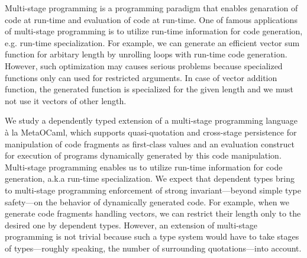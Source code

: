 \documentclass[master,english]{kuisthesis}
\begin{document}
\date{Feburary 15, 2020}			%

\maketitle

\begin{eabstract}


Multi-stage programming is a programming paradigm that enables genaration of
code at run-time and evaluation of code at run-time. One of famous
applications of multi-stage programming is to utilize run-time information
for code generation, e.g. run-time specialization. For example, we can
generate an efficient vector sum function for arbitary length by unrolling
loops with run-time code generation. However, such optimization may causes
serious problems because specialized functions only can used for restricted
arguments. In case of vector addition function, the generated function is
specialized for the given length and we must not use it vectors of other
length.


We study a dependently typed extension of a multi-stage programming language
\`a la MetaOCaml, which supports quasi-quotation and cross-stage persistence
for manipulation of code fragments as first-class values and an evaluation
    construct for execution of programs dynamically generated by this code
    manipulation. Multi-stage programming enables us to utilize run-time
    information for code generation, a.k.a run-time specialization. We expect
    that dependent types bring to multi-stage programming enforcement of strong
    invariant---beyond simple type safety---on the behavior of dynamically
    generated code. For example, when we generate code fragments handling
    vectors, we can restrict their length only to the desired one by dependent
    types. However, an extension of multi-stage programming is not trivial
    because such a type system would have to take stages of types---roughly
    speaking, the number of surrounding quotations---into account.


\end{eabstract}
\end{document}
